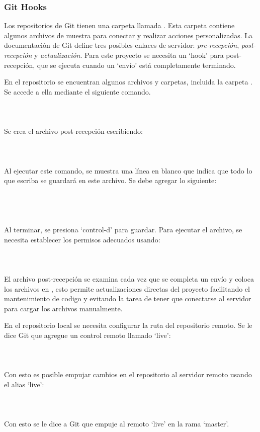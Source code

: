 \subsubsection{Git Hooks}
Los repositorios de Git tienen una carpeta llamada . Esta carpeta contiene algunos archivos de muestra para conectar y realizar acciones personalizadas. La documentación de Git define tres posibles enlaces de servidor: \textit{pre-recepción}, \textit{post-recepción} y \textit{actualización}. Para este proyecto se necesita un `\gls{hook}' para post-recepción, que se ejecuta cuando un `envío' está completamente terminado.
\vspace{0.8cm}

En el repositorio se encuentran algunos archivos y carpetas, incluida la carpeta . Se accede a ella mediante el siguiente comando.\\
\\
\\
\\
Se crea el archivo post-recepción escribiendo:\\
\\
\\
\\
Al ejecutar este comando, se muestra una línea en blanco que indica que todo lo que escriba se guardará en este archivo. Se debe agregar lo siguiente:\\
\\
\\
\\
\\
Al terminar, se presiona `control-d' para guardar. Para ejecutar el archivo, se necesita establecer los permisos adecuados usando:\\
\\
\\
\\
El archivo post-recepción se examina cada vez que se completa un envío y coloca los archivos en , esto permite actualizaciones directas del proyecto facilitando el mantenimiento de codigo y evitando la tarea de tener que conectarse al servidor para cargar los archivos manualmente.
\vspace{0.8cm}

En el repositorio local se necesita configurar la ruta del repositorio remoto. Se le dice Git que agregue un control remoto llamado `live':\\
\\
\\
\\
Con esto es posible empujar cambios en el repositorio al servidor remoto usando el alias `live':\\
\\
\\
\\
Con esto se le dice a Git que empuje al remoto `live' en la rama `master'.
\vspace{0.8cm}

